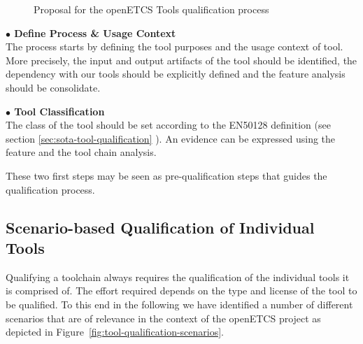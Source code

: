 \begin{figure}[htbp]
\begin{center}
{}
\end{center}
\caption{Proposal for the openETCS Tools qualification process}
\label{fig:tool_qualification_process}
\end{figure}

{\bf $\bullet$ Define Process \& Usage Context}\\
The process starts by defining the tool purposes and the usage context
of tool. More precisely, the input and output artifacts of the tool
should be identified, the dependency with our tools should be
explicitly defined and the feature analysis should be consolidate.

{\bf $\bullet$  Tool Classification}\\
The class of the tool should be set according to the EN50128
definition (see section \ref{sec:sota-tool-qualification} ). An evidence can be expressed using the feature and
the tool chain analysis.


These two first steps may be seen as pre-qualification steps that
guides the qualification process.

\subsection{Scenario-based Qualification of Individual Tools}
\label{sec:scenario-based-tool-quali}


Qualifying a toolchain always requires the qualification of the individual tools it is comprised of. The effort required depends on the type and license of the tool to be qualified. To this end in the following we have identified a number of different scenarios that are of relevance in the context of the openETCS project as depicted in Figure~\ref{fig:tool-qualification-scenarios}.

